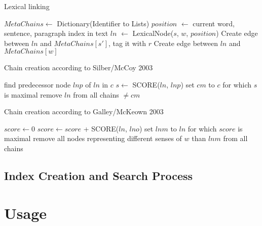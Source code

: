 \documentclass[11pt, a4paper, abstraction]{scrartcl}
\begin{document}
\begin{algorithm}
\caption{Lexical linking}
\begin{algorithmic}
	\STATE $MetaChains \gets$ Dictionary(Identifier to Lists)
		\STATE $position$ $\gets$ current word, sentence, paragraph index in text
				\STATE $ln$ $\gets$ LexicalNode($s$, $w$, $position$)
					\STATE Create edge between $ln$ and $MetaChains[s']$, tag it with $r$
				\ENDFOR
			\ENDFOR
		\ELSE
			\STATE Create edge between $ln$ and $MetaChains[w]$
		\ENDIF
	\ENDFOR
\end{algorithmic}
\end{algorithm}
\begin{algorithm}
\caption{Chain creation according to Silber/McCoy 2003}
\begin{algorithmic}
				\STATE find predecessor node $lnp$ of $ln$ in $c$
				\STATE $s \gets $ SCORE($ln$, $lnp$)
				\STATE set $cm$ to $c$ for which $s$ is maximal
			\ENDFOR
		\ENDFOR
		\STATE remove $ln$ from all chains $\neq cm$
	\ENDFOR
\end{algorithmic}
\end{algorithm}
\begin{algorithm}
\begin{algorithmic}
\caption{Chain creation according to Galley/McKeown 2003}
			\STATE $score \gets 0$
					\STATE $score \gets score$ + SCORE($ln$, $lno$)
				\ENDFOR
			\ENDFOR
			\STATE set $lnm$ to $ln$ for which $score$ is maximal 
		\ENDFOR
		\STATE remove all nodes representing different senses of $w$ than $lnm$ from all chains
	\ENDFOR 
\end{algorithmic}
\end{algorithm}
 
\subsection{Index Creation and Search Process}

\section{Usage}
\end{document}
